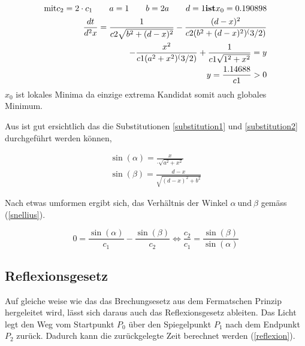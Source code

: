 \begin{align}
\text{mit} c_2=2 \cdot c_1 \qquad a=1 \qquad b=2a \qquad d=1 \textbf{ist} x_0 = 0.190898 \notag \\
\frac{dt}{d^2x}=\frac{1}{c2 \sqrt{b^2 + (d - x)^2}} - \frac{(d - x)^2 }{c2 (b^2 + (d - x)^2)^(3/2)} \notag \\
- \frac{x^2}{c1 (a^2 + x^2)^(3/2)} + \frac{1}{c1 \sqrt{1^2 + x^2}} = y  \notag \\
y =\frac{1.14688}{c1} > 0
\end{align}
$x_0$ ist lokales Minima da einzige extrema Kandidat somit auch globales Minimum.



Aus  ist gut ersichtlich das die Substitutionen \ref{substitution1} und \ref{substitution2} durchgeführt werden können,

\begin{align}
	\sin(\alpha) = \frac{x}{\cdot \sqrt{a^2 + x^2}}  \label{substitution1}\\
	\sin(\beta) = \frac{d-x}{\sqrt{(d -x)^2 + b^2}} \label{substitution2}
\end{align}

Nach etwas umformen ergibt sich, das Verhältnis der Winkel $\alpha \ \text{und} \ \beta$ gemäss (\eqref{snellius}).

\begin{equation}
	0 = \frac{\sin(\alpha)}{c_1} - \frac{\sin(\beta)}{c_2} \Leftrightarrow\frac{c_2}{c_1} = \frac{\sin(\beta)}{\sin(\alpha)}
	\label{snellius}
\end{equation}




\subsection{Reflexionsgesetz}
\cite{Wikipedia} Auf gleiche weise wie das das Brechungsesetz aus dem Fermatschen Prinzip hergeleitet wird, 
lässt sich daraus auch das Reflexionsgesetz ableiten.
Das Licht legt den Weg vom Startpunkt $P_0$ über den Spiegelpunkt $P_1$ 
nach dem Endpunkt $P_2$ zurück. Dadurch kann die zurückgelegte Zeit berechnet werden (\eqref{reflexion}).


